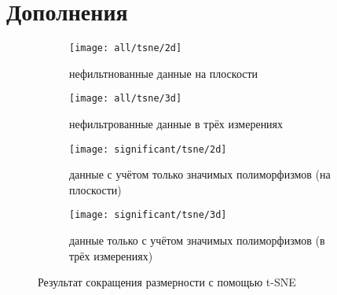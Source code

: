 \documentclass[main.tex]{subfiles}
\begin{document}
\newpage
\section{Дополнения}\label{appendix}

\begin{figure}[H]
	\centering
	\begin{subfigure}{.5\textwidth}
		\centering
		\texttt{[image: all/tsne/2d]}
		\captionsetup{width=.8\linewidth}
		\caption{нефильтнованные данные на плоскости}
		\label{fig:all_tsne_2d}
	\end{subfigure}%
	\begin{subfigure}{.5\textwidth}
		\centering
		\texttt{[image: all/tsne/3d]}
		\captionsetup{width=.8\linewidth}
		\caption{нефильтрованные данные в трёх измерениях}
		\label{fig:all_tsne_3d}
	\end{subfigure}

	\begin{subfigure}{.5\textwidth}
		\centering
		\texttt{[image: significant/tsne/2d]}
		\captionsetup{width=.8\linewidth}
		\caption{данные с учётом только значимых полиморфизмов (на плоскости)}
		\label{fig:signif_tsne_2d}
	\end{subfigure}%
	\begin{subfigure}{.5\textwidth}
		\centering
		\texttt{[image: significant/tsne/3d]}
		\captionsetup{width=.8\linewidth}
		\caption{данные только с учётом значимых полиморфизмов (в трёх измерениях)}
		\label{fig:signif_tsne_3d}
	\end{subfigure}
	\caption{Результат сокращения размерности с помощью t-SNE}
\end{figure}
\end{document}
